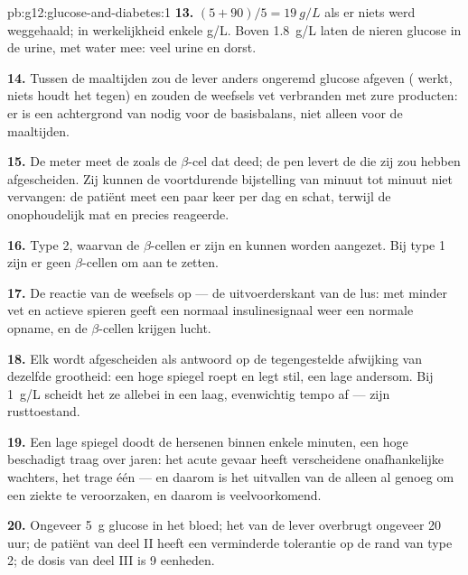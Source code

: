 \begin{solution}{pb:g12:glucose-and-diabetes:1}
\textbf{13.} $(5 + 90)/5 = \qty{19}{g/L}$ als er niets werd weggehaald; in
werkelijkheid enkele \unit{g/L}. Boven \qty{1.8}{g/L} laten de nieren
glucose in de urine, met water mee: veel urine en dorst.

\textbf{14.} Tussen de maaltijden zou de lever anders ongeremd glucose
afgeven ( werkt, niets houdt het tegen) en zouden de weefsels vet
verbranden met zure producten: er is een achtergrond van  nodig
voor de basisbalans, niet alleen voor de maaltijden.

\textbf{15.} De meter meet de  zoals de $\beta$-cel dat deed;
de pen levert de  die zij zou hebben afgescheiden. Zij kunnen de
voortdurende bijstelling van minuut tot minuut niet vervangen: de patiënt
meet een paar keer per dag en schat, terwijl de  onophoudelijk mat en
precies reageerde.

\textbf{16.} Type 2, waarvan de $\beta$-cellen er zijn en kunnen worden
aangezet. Bij type 1 zijn er geen $\beta$-cellen om aan te zetten.

\textbf{17.} De reactie van de weefsels op  --- de uitvoerderskant
van de lus: met minder vet en actieve spieren geeft een normaal
insulinesignaal weer een normale opname, en de $\beta$-cellen krijgen lucht.

\textbf{18.} Elk wordt afgescheiden als antwoord op de tegengestelde
afwijking van dezelfde grootheid: een hoge spiegel roept  en legt
 stil, een lage andersom. Bij \qty{1}{g/L} scheidt het  ze
allebei in een laag, evenwichtig tempo af --- zijn rusttoestand.

\textbf{19.} Een lage spiegel doodt de hersenen binnen enkele minuten, een
hoge beschadigt traag over jaren: het acute gevaar heeft verscheidene
onafhankelijke wachters, het trage één --- en daarom is het uitvallen van
de  alleen al genoeg om een ziekte te veroorzaken, en daarom is
 veelvoorkomend.

\textbf{20.} Ongeveer \qty{5}{g} glucose in het bloed; het  van
de lever overbrugt ongeveer 20 uur; de patiënt van deel II heeft een
verminderde tolerantie op de rand van  type 2; de dosis van deel
III is 9 eenheden.
\end{solution}
